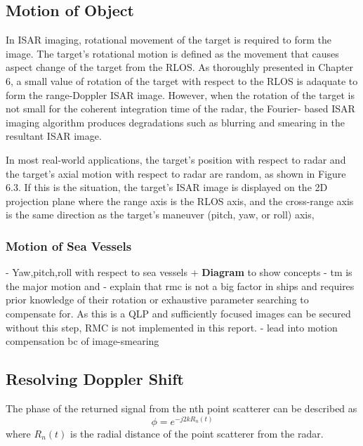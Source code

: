 \documentclass[class=report,11pt,crop=false]{standalone}
\begin{document}
    \subsection{Motion of Object}
    In ISAR imaging, rotational movement of the target is required to form the image.
    The target’s rotational motion is defined as the movement that causes aspect change of the target from the RLOS. As thoroughly presented in Chapter 6, a small value of rotation of the target with respect to the RLOS is adaquate to form the range-Doppler ISAR image. However, when the rotation of the target is not small for the coherent integration time of the radar, the Fourier- based ISAR imaging algorithm produces degradations such as blurring and smearing in the resultant ISAR image.
    
    In most real-world applications, the target’s position with respect to radar and the target’s axial motion with respect to radar are random, as shown in Figure 6.3. If this is the situation, the target’s ISAR image is displayed on the 2D projection plane where the range axis is the RLOS axis, and the cross-range axis is the same direction as the target’s maneuver (pitch, yaw, or roll) axis,
    \subsubsection{Motion of Sea Vessels}
    - Yaw,pitch,roll with respect to sea vessels + \textbf{Diagram} to show concepts
    - tm is the major motion and 
    - explain that rmc is not a big factor in ships and requires prior knowledge of their rotation or exhaustive parameter searching to compensate for. As this is a QLP and sufficiently focused images can be secured without this step, RMC is not implemented in this report.
    - lead into motion compensation bc of image-smearing
    

    \subsection{Resolving Doppler Shift}
    The phase of the returned signal from the nth point scatterer can be described as
    \begin{equation}
        \phi = e^{-j2kR_n(t)}
    \end{equation}
    where $R_n(t)$ is the radial distance of the point scatterer from the radar.
\end{document}
